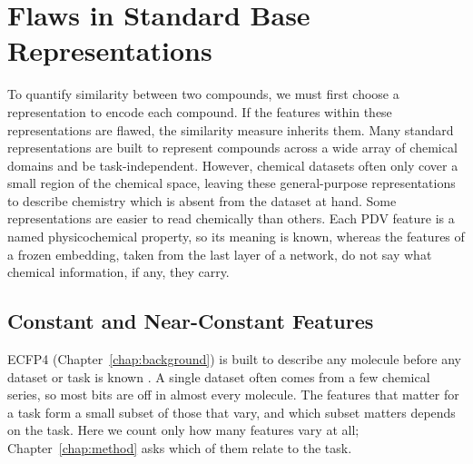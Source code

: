 \section{Flaws in Standard Base Representations}\label{sec:flaws:representations} %

To quantify similarity between two compounds, we must first choose a representation to encode each compound. If the features within these representations are flawed, the similarity measure inherits them. Many standard representations are built to represent compounds across a wide array of chemical domains and be task-independent. However, chemical datasets often only cover a small region of the chemical space, leaving these general-purpose representations to describe chemistry which is absent from the dataset at hand. Some representations are easier to read chemically than others. Each PDV feature is a named physicochemical property, so its meaning is known, whereas the features of a frozen embedding, taken from the last layer of a network, do not say what chemical information, if any, they carry.



\subsection{Constant and Near-Constant Features}\label{sec:flaws:constant} %
ECFP4 (Chapter~\ref{chap:background}) is built to describe any molecule before any dataset or task is known \citep{rogers2010}. A single dataset often comes from a few chemical series, so most bits are off in almost every molecule. The features that matter for a task form a small subset of those that vary, and which subset matters depends on the task. Here we count only how many features vary at all; Chapter~\ref{chap:method} asks which of them relate to the task.

